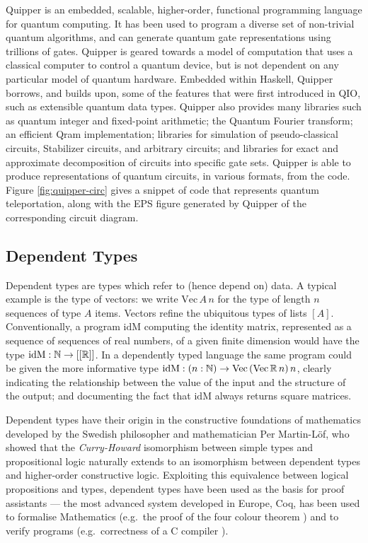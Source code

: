 \documentclass[a4paper]{article}
\begin{document}
Quipper  is an embedded, scalable,
higher-order, functional programming language for quantum computing. It
has been used to program a diverse set of non-trivial quantum
algorithms, and can generate quantum gate representations using
trillions of gates. Quipper is geared towards a model of computation
that uses a classical computer to control a quantum device, but is not
dependent on any particular model of quantum hardware. Embedded within
Haskell, Quipper borrows, and builds upon, some of the features that were
first introduced in QIO, such as extensible quantum data
types. Quipper also provides many libraries such as quantum integer
and fixed-point arithmetic; the Quantum Fourier transform; an
efficient Qram implementation; libraries for simulation of
pseudo-classical circuits, Stabilizer circuits, and arbitrary
circuits; and libraries for exact and approximate decomposition of
circuits into specific gate sets. Quipper is able to produce
representations of quantum circuits, in various formats, from the
code. Figure \ref{fig:quipper-circ} gives a snippet of code that
represents quantum teleportation, along with the EPS figure generated
by Quipper of the corresponding circuit diagram.

\subsection*{Dependent Types}
Dependent types are types which refer to (hence depend on)
data. A typical example is the type of vectors: we write
$\mathrm{Vec}\,A\,n$ for the type of length $n$ sequences of type $A$
items. Vectors refine the ubiquitous types of lists $[A]$.
Conventionally, a program $\mathrm{idM}$ computing the identity
matrix, represented as a sequence of sequences of real numbers, of a
given finite dimension would have the type $\mathrm{idM} : \Bbb{N} \to
[[\Bbb{R}]]$. In a dependently typed language the same program could
be given the more informative type $\mathrm{idM} : (n:\Bbb{N}) \to
\mathrm{Vec}\,(\mathrm{Vec}\,\Bbb{R}\,n)\,n$, clearly indicating the
relationship between the value of the input and the structure of the
output; and documenting the fact that $\mathrm{idM}$ always returns
square matrices.

Dependent types have their origin in the constructive foundations of
mathematics developed by the Swedish
philosopher and mathematician Per Martin-L\"of, who showed that the
\emph{Curry-Howard} isomorphism between simple types and propositional
logic naturally extends to an isomorphism between dependent types and
higher-order constructive logic.  Exploiting this equivalence between
logical propositions and types, dependent types have been used as the
basis for proof assistants --- the most advanced system developed in
Europe, Coq, has been used to formalise Mathematics (e.g.\
the proof of the four colour theorem
) and to verify programs (e.g.\
correctness of a C
compiler \citemain{compcert-back}).
\end{document}
